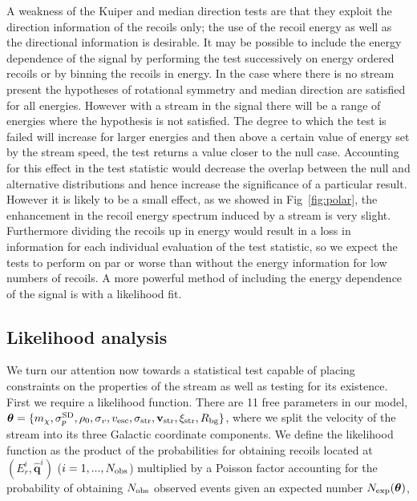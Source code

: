 A weakness of the Kuiper and median direction tests are that they exploit the direction information of the recoils only; the use of the recoil energy as well as the directional information is desirable. It may be possible to include the energy dependence of the signal by performing the test successively on energy ordered recoils or by binning the recoils in energy. In the case where there is no stream present the hypotheses of rotational symmetry and median direction are satisfied for all energies. However with a stream in the signal there will be a range of energies where the hypothesis is not satisfied. The degree to which the test is failed will increase for larger energies and then above a certain value of energy set by the stream speed, the test returns a value closer to the null case. Accounting for this effect in the test statistic would decrease the overlap between the null and alternative distributions and hence increase the significance of a particular result. However it is likely to be a small effect, as we showed in Fig~\ref{fig:polar}, the enhancement in the recoil energy spectrum induced by a stream is very slight. Furthermore dividing the recoils up in energy would result in a loss in information for each individual evaluation of the test statistic, so we expect the tests to perform on par or worse than without the energy information for low numbers of recoils. A more powerful method of including the energy dependence of the signal is with a likelihood fit.





\subsection{Likelihood analysis}\label{sec:directional_likelihood}
We turn our attention now towards a statistical test capable of placing constraints on the properties of the stream as well as testing for its existence. First we require a likelihood function. There are 11 free parameters in our model, $\boldsymbol{\theta} = \lbrace m_\chi, \sigma^{\rm SD}_p, \rho_0, \sigma_v,v_\textrm{esc},\sigma_\textrm{str},\textbf{v}_{\rm str},\xi_{\rm str},R_\textrm{bg}\rbrace$, where we split the velocity of the stream into its three Galactic coordinate components. We define the likelihood function as the product of the probabilities for obtaining recoils located at $(E_r^i,\hat{\textbf{q}}^i)$ ($i = 1, ..., N_{\rm obs}$) multiplied by a Poisson factor accounting for the probability of obtaining $N_{\rm obs}$ observed events given an expected number $N_{\rm exp}(\boldsymbol{\theta})$,

